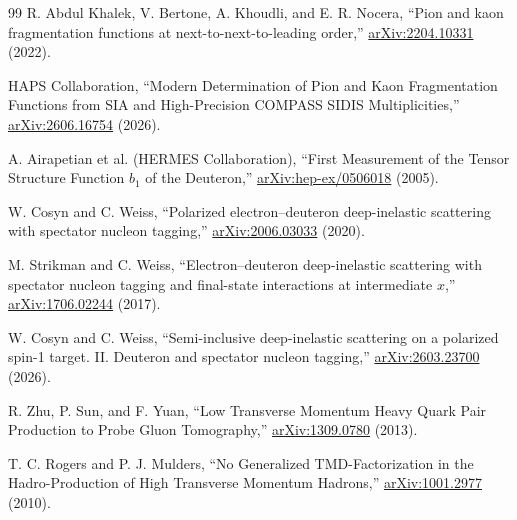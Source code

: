 \documentclass[11pt]{article}
\begin{document}
\begin{thebibliography}{99}
R. Abdul Khalek, V. Bertone, A. Khoudli, and E. R. Nocera,
``Pion and kaon fragmentation functions at next-to-next-to-leading order,''
\href{https://arxiv.org/abs/2204.10331}{arXiv:2204.10331} (2022).

HAPS Collaboration,
``Modern Determination of Pion and Kaon Fragmentation Functions from SIA and High-Precision COMPASS SIDIS Multiplicities,''
\href{https://arxiv.org/abs/2606.16754}{arXiv:2606.16754} (2026).

A. Airapetian et al. (HERMES Collaboration),
``First Measurement of the Tensor Structure Function \(b_1\) of the Deuteron,''
\href{https://arxiv.org/abs/hep-ex/0506018}{arXiv:hep-ex/0506018} (2005).

W. Cosyn and C. Weiss,
``Polarized electron--deuteron deep-inelastic scattering with spectator nucleon tagging,''
\href{https://arxiv.org/abs/2006.03033}{arXiv:2006.03033} (2020).

M. Strikman and C. Weiss,
``Electron--deuteron deep-inelastic scattering with spectator nucleon tagging and final-state interactions at intermediate \(x\),''
\href{https://arxiv.org/abs/1706.02244}{arXiv:1706.02244} (2017).

W. Cosyn and C. Weiss,
``Semi-inclusive deep-inelastic scattering on a polarized spin-1 target. II. Deuteron and spectator nucleon tagging,''
\href{https://arxiv.org/abs/2603.23700}{arXiv:2603.23700} (2026).

R. Zhu, P. Sun, and F. Yuan,
``Low Transverse Momentum Heavy Quark Pair Production to Probe Gluon Tomography,''
\href{https://arxiv.org/abs/1309.0780}{arXiv:1309.0780} (2013).

T. C. Rogers and P. J. Mulders,
``No Generalized TMD-Factorization in the Hadro-Production of High Transverse Momentum Hadrons,''
\href{https://arxiv.org/abs/1001.2977}{arXiv:1001.2977} (2010).

\end{thebibliography}
\end{document}
